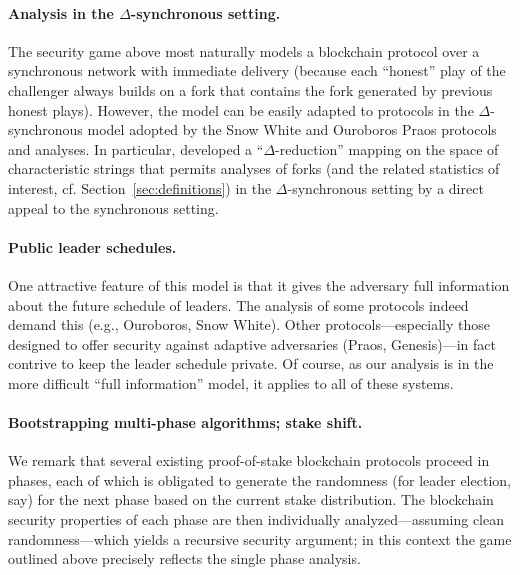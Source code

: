 \paragraph{Analysis in the $\Delta$-synchronous setting.} The security
game above most naturally models a blockchain protocol over a
synchronous network with immediate delivery (because each ``honest''
play of the challenger always builds on a fork that contains the fork
generated by previous honest plays). However, the model can be easily
adapted to protocols in the $\Delta$-synchronous model adopted by
the Snow White and Ouroboros Praos protocols and analyses. In
particular, \citet{DBLP:conf/eurocrypt/DavidGKR18} developed a
``$\Delta$-reduction'' mapping on the space of characteristic strings
that permits analyses of forks (and the related statistics of
interest, cf. Section~\ref{sec:definitions}) in the $\Delta$-synchronous
setting by a direct appeal to the synchronous setting.

\paragraph{Public leader schedules.} One attractive feature of this
model is that it gives the adversary full information about the future
schedule of leaders. The analysis of some protocols indeed demand this
(e.g., Ouroboros, Snow White). Other protocols---especially those
designed to offer security against adaptive adversaries (Praos,
Genesis)---in fact contrive to keep the leader schedule private. Of
course, as our analysis is in the more difficult ``full information''
model, it applies to all of these systems.

\paragraph{Bootstrapping multi-phase algorithms; stake shift.} We remark that
several existing proof-of-stake blockchain protocols proceed in
phases, each of which is obligated to generate the randomness (for
leader election, say) for the next phase based on the current stake
distribution. The blockchain security properties of each phase are
then individually analyzed---assuming clean randomness---which yields
a recursive security argument; in this context the game outlined above
precisely reflects the single phase analysis.

